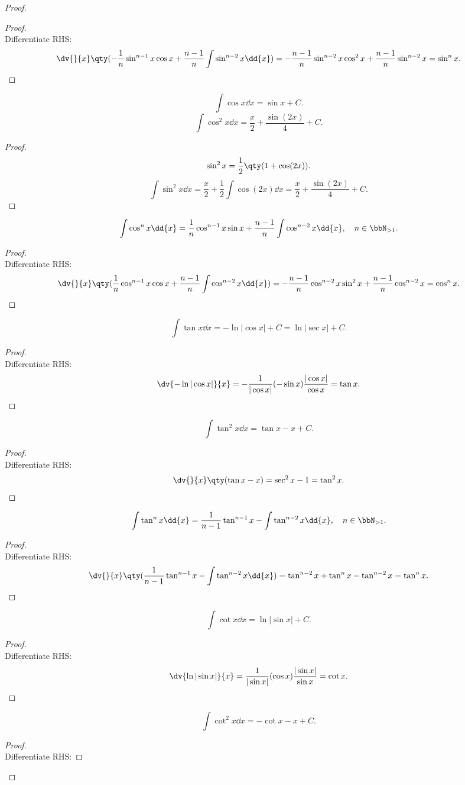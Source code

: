 \documentclass[a4paper,12pt]{report}
\begin{document}
\begin{itemize}
\begin{itemize}
\begin{proof}
\begin{proof}\mbox{}\\
    Differentiate RHS:
    \[\dv{}{x}\qty(-\frac{1}{n}\sin^{n-1}x\cos x+\frac{n-1}{n}\int\sin^{n-2}x\dd{x})=-\frac{n-1}{n}\sin^{n-2}x\cos^2 x+\frac{n-1}{n}\sin^{n-2}x=\sin^n x.\]
\end{proof}
\[\int\cos x\dd{x}=\sin x+C.\]
\[\int\cos^2 x\dd{x}=\frac{x}{2}+\frac{\sin(2x)}{4}+C.\]
\begin{proof}
    \[\sin^2 x=\frac{1}{2}\qty(1+\cos(2x)).\]
    \[\int\sin^2 x\dd{x}=\frac{x}{2}+\frac{1}{2}\int\cos(2x)\dd{x}=\frac{x}{2}+\frac{\sin(2x)}{4}+C.\]
\end{proof}
\[\int\cos^n x\dd{x}=\frac{1}{n}\cos^{n-1}x\sin x+\frac{n-1}{n}\int\cos^{n-2}x\dd{x},\quad n\in\bbN_{>1}.\]
\begin{proof}\mbox{}\\
    Differentiate RHS:
    \[\dv{}{x}\qty(\frac{1}{n}\cos^{n-1}x\cos x+\frac{n-1}{n}\int\cos^{n-2}x\dd{x})=-\frac{n-1}{n}\cos^{n-2}x\sin^2 x+\frac{n-1}{n}\cos^{n-2}x=\cos^n x.\]
\end{proof}
\[\int\tan x\dd{x}=-\ln|\cos x|+C=\ln|\sec x|+C.\]
\begin{proof}\mbox{}\\
    Differentiate RHS:
    \[\dv{-\ln|\cos x|}{x}=-\frac{1}{|\cos x|}(-\sin x)\frac{|\cos x|}{\cos x}=\tan x.\]
\end{proof}
\[\int\tan^2 x\dd{x}=\tan x-x+C.\]
\begin{proof}\mbox{}\\
    Differentiate RHS:
    \[\dv{}{x}\qty(\tan x-x)=\sec^2 x-1=\tan^2x.\]
\end{proof}
\[\int\tan^n x\dd{x}=\frac{1}{n-1}\tan^{n-1}x-\int\tan^{n-2}x\dd{x},\quad n\in\bbN_{>1}.\]
\begin{proof}\mbox{}\\
    Differentiate RHS:
    \[\dv{}{x}\qty(\frac{1}{n-1}\tan^{n-1}x-\int\tan^{n-2}x\dd{x})=\tan^{n-2}x+\tan^nx-\tan^{n-2}x=\tan^n x.\]
\end{proof}
\[\int\cot x\dd{x}=\ln|\sin x|+C.\]
\begin{proof}\mbox{}\\
    Differentiate RHS:
    \[\dv{\ln|\sin x|}{x}=\frac{1}{|\sin x|}(\cos x)\frac{|\sin x|}{\sin x}=\cot x.\]
\end{proof}
\[\int\cot^2 x\dd{x}=-\cot x-x+C.\]
\begin{proof}\mbox{}\\
    Differentiate RHS:

\end{proof}
\end{proof}
\end{itemize}
\end{itemize}
\end{document}

